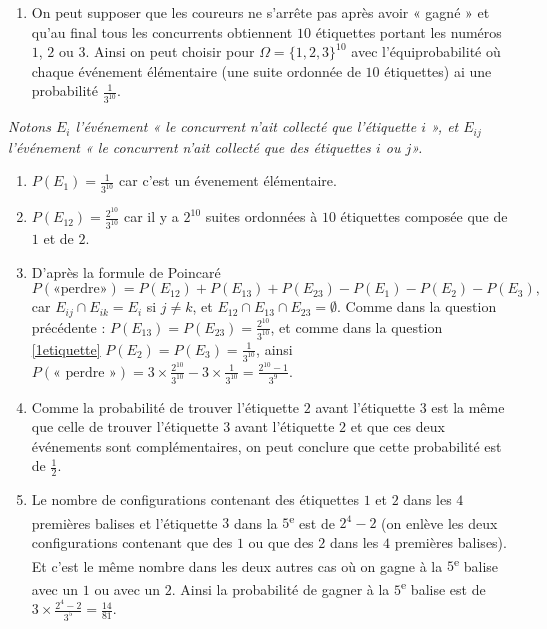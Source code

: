 \documentclass[a4paper,12pt,reqno]{amsart}
\begin{document}
\begin{solution}
  \begin{enumerate}
    \item On peut supposer que les coureurs ne s'arrête pas après avoir « gagné » et qu'au final tous les concurrents obtiennent $10$ étiquettes portant les numéros $1$, $2$ ou $3$. Ainsi on peut choisir pour $\Omega = \{1,2,3\}^{10}$ avec l'équiprobabilité où chaque événement élémentaire (une suite ordonnée de $10$ étiquettes) ai une probabilité $\frac{1}{3^{10}}$.
  \end{enumerate}

    \emph{Notons $E_{i}$ l'événement « le concurrent n'ait collecté que l'étiquette $i$ », et $E_{ij}$ l'événement « le concurrent n'ait collecté que des étiquettes $i$ ou $j$».}

  \begin{enumerate}[resume]
    \item\label{1etiquette} $P(E_{1}) = \frac{1}{3^{10}}$ car c'est un évenement élémentaire.
    \item $P(E_{12}) = \frac{2^{10}}{3^{10}}$ car il y a $2^{10}$ suites ordonnées à $10$ étiquettes composée que de $1$ et de $2$.
    \item\label{perdre} D'après la formule de Poincaré
    $$
      P(\text{«perdre»}) = P(E_{12})+P(E_{13})+P(E_{23})-P(E_{1})-P(E_{2})-P(E_{3}),
    $$
    car $E_{ij} \cap E_{ik} = E_{i}$ si $j \neq k$, et $E_{12}\cap E_{13}\cap E_{23} = \emptyset$. Comme dans la question précédente : $P(E_{13}) = P(E_{23}) =\frac{2^{10}}{3^{10}}$, et comme dans la question \ref{1etiquette} $P(E_{2}) = P(E_{3}) = \frac{1}{3^{10}}$, ainsi $P(\text{« perdre »}) = 3 \times \frac{2^{10}}{3^{10}} - 3 \times \frac{1}{3^{10}}= \frac{2^{10}-1}{3^{9}}$.
    \item Comme la probabilité de trouver l'étiquette $2$ avant l'étiquette $3$ est la même que celle de trouver l'étiquette $3$ avant l'étiquette $2$ et que ces deux événements sont complémentaires, on peut conclure que cette probabilité est de $\frac{1}{2}$.
    \item Le nombre de configurations contenant des étiquettes $1$ et $2$ dans les $4$ premières balises et l'étiquette $3$ dans la $5$\textsuperscript{e} est de $2^{4}-2$ (on enlève les deux configurations contenant que des $1$ ou que des $2$ dans les $4$ premières balises). Et c'est le même nombre dans les deux autres cas où on gagne à la $5$\textsuperscript{e} balise avec un $1$ ou avec un $2$. Ainsi la probabilité de gagner à la $5$\textsuperscript{e} balise est de $3 \times \frac{2^{4}-2}{3^{5}} = \frac{14}{81}$.
  \end{enumerate}

\end{solution}
\end{document}
